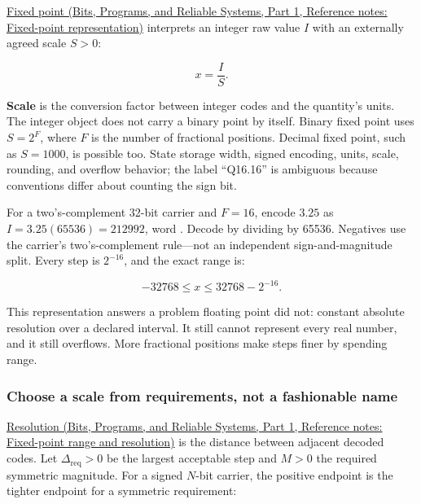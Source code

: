 \href{../01-Bits-Programs-and-Reliable-Systems-P01/main.pdf\#nameddest=appendix-1d0dbe8924cc}{Fixed point (Bits, Programs, and Reliable Systems, Part 1, Reference notes: Fixed-point representation)} interprets an integer raw value \(I\) with an externally agreed scale \(S>0\):

\[
x=\frac{I}{S}.
\]

\textbf{Scale} is the conversion factor between integer codes and the quantity's units. The integer object does not carry a binary point by itself. Binary fixed point uses \(S=2^F\), where \(F\) is the number of fractional positions. Decimal fixed point, such as \(S=1000\), is possible too. State storage width, signed encoding, units, scale, rounding, and overflow behavior; the label ``Q16.16'' is ambiguous because conventions differ about counting the sign bit.

For a two's-complement 32-bit carrier and \(F=16\), encode \(3.25\) as \(I=3.25(65536)=212992\), word . Decode by dividing by 65536. Negatives use the carrier's two's-complement rule---not an independent sign-and-magnitude split. Every step is \(2^{-16}\), and the exact range is:

\[
-32768\le x\le32768-2^{-16}.
\]

This representation answers a problem floating point did not: constant absolute resolution over a declared interval. It still cannot represent every real number, and it still overflows. More fractional positions make steps finer by spending range.

\subsubsection{Choose a scale from requirements, not a fashionable name}\label{05-engine-i-ch001-choose-a-scale-from-requirements-not-a-fashionable-name}

\hypertarget{05-engine-i-ch001-choose-a-scale-from-requirements-not-a-fashionable-name}{}

\href{../01-Bits-Programs-and-Reliable-Systems-P01/main.pdf\#nameddest=appendix-ceb4c4a9b5a1}{Resolution (Bits, Programs, and Reliable Systems, Part 1, Reference notes: Fixed-point range and resolution)} is the distance between adjacent decoded codes. Let \(\Delta_{\mathrm{req}}>0\) be the largest acceptable step and \(M>0\) the required symmetric magnitude. For a signed \(N\)-bit carrier, the positive endpoint is the tighter endpoint for a symmetric requirement:

